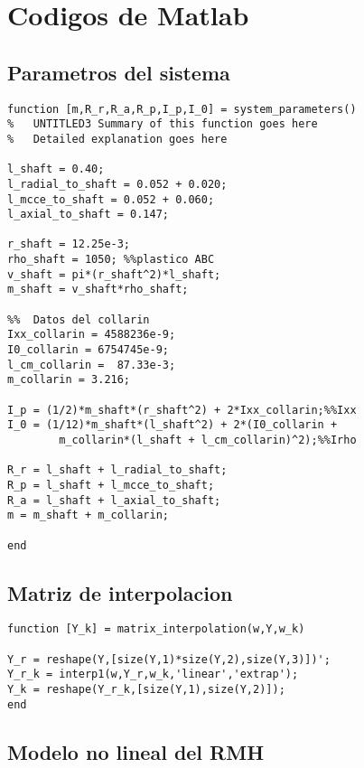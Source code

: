 \chapter{Codigos de Matlab}

\section{Parametros del sistema}

\begin{lstlisting}[frame=single]
function [m,R_r,R_a,R_p,I_p,I_0] = system_parameters()
%	UNTITLED3 Summary of this function goes here
%   Detailed explanation goes here

l_shaft = 0.40;
l_radial_to_shaft = 0.052 + 0.020;
l_mcce_to_shaft = 0.052 + 0.060;
l_axial_to_shaft = 0.147;

r_shaft = 12.25e-3;
rho_shaft = 1050; %%plastico ABC
v_shaft = pi*(r_shaft^2)*l_shaft;
m_shaft = v_shaft*rho_shaft;

%%	Datos del collarin
Ixx_collarin = 4588236e-9;
I0_collarin = 6754745e-9;
l_cm_collarin =  87.33e-3;
m_collarin = 3.216;

I_p = (1/2)*m_shaft*(r_shaft^2) + 2*Ixx_collarin;%%Ixx
I_0 = (1/12)*m_shaft*(l_shaft^2) + 2*(I0_collarin + 
		m_collarin*(l_shaft + l_cm_collarin)^2);%%Irho

R_r = l_shaft + l_radial_to_shaft;
R_p = l_shaft + l_mcce_to_shaft;
R_a = l_shaft + l_axial_to_shaft;
m = m_shaft + m_collarin;

end
\end{lstlisting}

\section{Matriz de interpolacion}

\begin{lstlisting}[frame=single]
function [Y_k] = matrix_interpolation(w,Y,w_k)

Y_r = reshape(Y,[size(Y,1)*size(Y,2),size(Y,3)])';
Y_r_k = interp1(w,Y_r,w_k,'linear','extrap');
Y_k = reshape(Y_r_k,[size(Y,1),size(Y,2)]);
end
\end{lstlisting}

\section{Modelo no lineal del RMH} \label{ap:sistema-ecuaciones-no-lineal}

